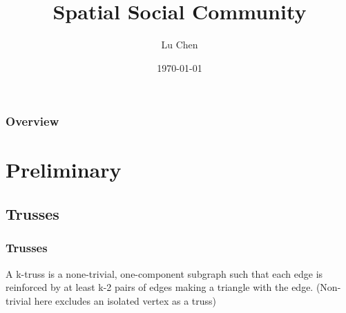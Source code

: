 \documentclass{beamer}
\title[ssc]{Spatial Social Community} %
\author{Lu Chen} %
\institute[FSET] %
{
Swinburne University of Technology \\ %
\medskip
\textit{luchen@swin.edu.au} %
}
\date{\today} %
\begin{document}
\begin{frame}
\titlepage %
\end{frame}

\begin{frame}
\frametitle{Overview} %
\tableofcontents %
\end{frame}


\section{Preliminary} %
\subsection{Trusses} %

\begin{frame}
\frametitle{Trusses}
\begin{definition}
A k-truss is a none-trivial, one-component subgraph such that each edge is reinforced by at least k-2 pairs of edges making a triangle with the edge. (Non-trivial here excludes an isolated vertex as a truss)
\end{definition}
\end{frame}

\end{document}
